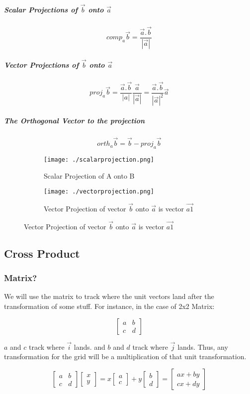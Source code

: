 \documentclass{article}
\begin{document}
	\subparagraph{Scalar Projections of $ \vec{b}$ onto $ \vec{a}$}
	\[comp_a \vec{b} = \frac{ \vec{a} . \vec{b}}{|\vec{a}|}	\]
	\subparagraph{Vector Projections of $ \vec{b}$ onto $ \vec{a}$}
	\[
		proj_a \vec{b} = 	\frac{ \vec{a} . \vec{b} }{|a|}	 \frac{ \vec{a} }{ |\vec{a}| } = \frac{ \vec{a} . \vec{b} }{| \vec{a} |^2} \vec{a}
	\]
	\subparagraph{The Orthogonal Vector to the projection}
	\[
		orth_a \vec{ b } = \vec{ b } - proj_a \vec{ b }
	\]
	\begin{figure}[h!]
		\begin{subfigure}{0.5\linewidth}
			\texttt{[image: ./scalarprojection.png]}
			\caption{Scalar Projection of A onto B}
		\end{subfigure} \qquad
		\begin{subfigure}{0.5\linewidth}
			\texttt{[image: ./vectorprojection.png]}
			\caption{Vector Projection of vector $ \vec{b}$ onto $ \vec{a}$ is vector $ \vec{a1}$}
		\end{subfigure}
	\end{figure}

	\newpage

	\subsection{Cross Product}

	\subsubsection{Matrix?}
	We will use the matrix to track where the unit vectors land after the transformation of some stuff. For instance, in the case of 2x2 Matrix:

	\[
		\left [
			\begin{matrix}
				a & b\\
				c & d
			\end{matrix} 
			\right ]
	\]

	$ a $ and $ c $ track where $ \vec{ i } $ lands. and $ b $ and $ d $ track where $ \vec{ j } $ lands. Thus, any transformation for the grid will be a multiplication of that unit transformation.

	\[
		\left [
			\begin{matrix}
				a & b\\
				c & d
			\end{matrix} 
			\right ]
		\left [
			\begin{matrix}
				x \\
				y	
			\end{matrix}
			\right ]
		=
		x \left [
			\begin{matrix}
				a \\ c
			\end{matrix}
			\right]
		+ y \left [
			\begin{matrix}
				b \\ d
			\end{matrix}
			\right]
		= \left [
			\begin{matrix}
				a x + b y \\ c x + d y 
			\end{matrix}
			\right]
	\]
\end{document}
